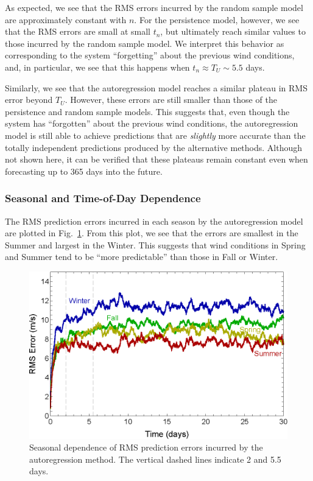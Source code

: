 \documentclass[11pt, oneside]{article}
\newcommand{\figref}[1]{Fig.~\ref{#1}}
\begin{document}
As expected, we see that the RMS errors incurred by the random sample model are approximately constant with $n$.
For the persistence model, however, we see that the RMS errors are small at small $t_n$, but ultimately reach similar values to those incurred by the random sample model.
We interpret this behavior as corresponding to the system ``forgetting'' about the previous wind conditions, and, in particular, we see that this happens when $t_n \approx T_U \sim 5.5$ days.

Similarly, we see that the autoregression model reaches a similar plateau in RMS error beyond $T_U$.
However, these errors are still smaller than those of the persistence and random sample models.
This suggests that, even though the system has ``forgotten'' about the previous wind conditions, the autoregression model is still able to achieve predictions that are \textit{slightly} more accurate than the totally independent predictions produced by the alternative methods.
Although not shown here, it can be verified that these plateaus remain constant even when forecasting up to 365 days into the future. %

\subsubsection{Seasonal and Time-of-Day Dependence}
The RMS prediction errors incurred in each season by the autoregression model are plotted in \figref{fig:SeasonalRMS}.
From this plot, we see that the errors are smallest in the Summer and largest in the Winter.
This suggests that wind conditions in Spring and Summer tend to be ``more predictable'' than those in Fall or Winter. %

\begin{figure}[htb]
\centering
\includegraphics[width=0.7\columnwidth]{figures/SeasonalRMSPredictionError}
\caption{Seasonal dependence of RMS prediction errors incurred by the autoregression method.
The vertical dashed lines indicate 2 and 5.5 days.}
\label{fig:SeasonalRMS}
\end{figure}
\end{document}
